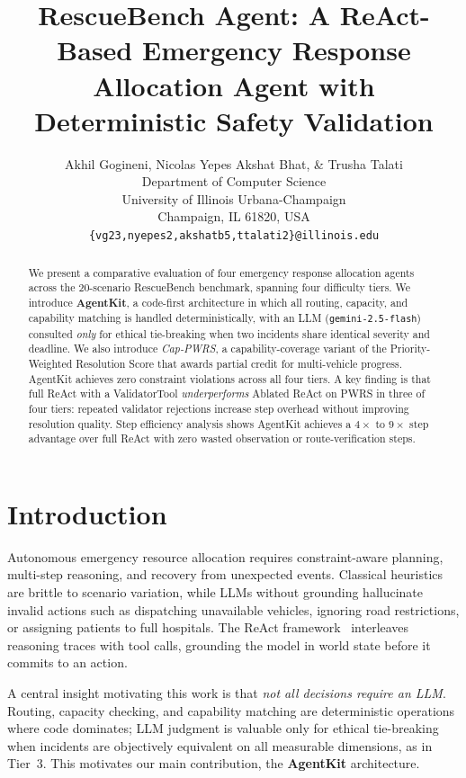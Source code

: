 \documentclass{article}
\title{RescueBench Agent: A ReAct-Based Emergency Response
Allocation Agent with Deterministic Safety Validation}
\author{Akhil Gogineni, Nicolas Yepes Akshat Bhat, \& Trusha Talati \\
Department of Computer Science\\
University of Illinois Urbana-Champaign\\
Champaign, IL 61820, USA \\
\texttt{\{vg23,nyepes2,akshatb5,ttalati2\}@illinois.edu}
}
\begin{document}
\maketitle

\begin{abstract}
We present a comparative evaluation of four emergency response allocation
agents across the 20-scenario RescueBench benchmark, spanning four difficulty
tiers. We introduce \textbf{AgentKit}, a code-first architecture in which all
routing, capacity, and capability matching is handled deterministically, with
an LLM (\texttt{gemini-2.5-flash}) consulted \emph{only} for ethical
tie-breaking when two incidents share identical severity and deadline. We
also introduce \emph{Cap-PWRS}, a capability-coverage variant of the
Priority-Weighted Resolution Score that awards partial credit for
multi-vehicle progress. AgentKit achieves zero constraint violations across
all four tiers. A key finding is that full ReAct with a ValidatorTool
\emph{underperforms} Ablated ReAct on PWRS in three of four tiers: repeated
validator rejections increase step overhead without improving resolution
quality. Step efficiency analysis shows AgentKit achieves a $4\times$ to
$9\times$ step advantage over full ReAct with zero wasted observation or
route-verification steps.
\end{abstract}

\section{Introduction}
\label{sec:intro}

Autonomous emergency resource allocation requires constraint-aware planning,
multi-step reasoning, and recovery from unexpected events. Classical heuristics
are brittle to scenario variation, while LLMs without grounding hallucinate
invalid actions such as dispatching unavailable vehicles, ignoring road
restrictions, or assigning patients to full hospitals. The ReAct
framework~\citep{yao2023react} interleaves reasoning traces with tool calls,
grounding the model in world state before it commits to an action.

A central insight motivating this work is that \emph{not all decisions require
an LLM}. Routing, capacity checking, and capability matching are deterministic
operations where code dominates; LLM judgment is valuable only for ethical
tie-breaking when incidents are objectively equivalent on all measurable
dimensions, as in Tier~3. This motivates our main contribution, the
\textbf{AgentKit} architecture.
\end{document}
